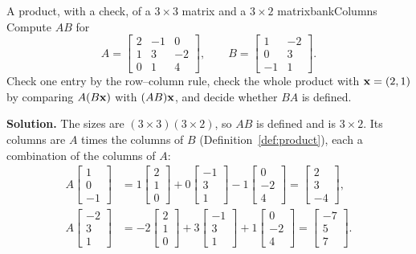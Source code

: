 \documentclass[11pt]{article}
\begin{document}
\begin{exmp}{A product, with a check, of a $3\times3$ matrix and a $3\times2$ matrix}{bankColumns}
Compute $AB$ for
\[
A=\begin{bmatrix}2&-1&0\\1&3&-2\\0&1&4\end{bmatrix},\qquad B=\begin{bmatrix}1&-2\\0&3\\-1&1\end{bmatrix}.
\]
Check one entry by the row--column rule, check the whole product with $\mathbf{x}=(2,1)$ by comparing $A(B\mathbf{x})$ with $(AB)\mathbf{x}$, and decide whether $BA$ is defined.

\textbf{Solution.} The sizes are $(3\times3)(3\times2)$, so $AB$ is defined and is $3\times2$. Its columns are $A$ times the columns of $B$ (Definition~\ref{def:product}), each a combination of the columns of $A$:
\begin{align*}
A\begin{bmatrix}1\\0\\-1\end{bmatrix}&=1\begin{bmatrix}2\\1\\0\end{bmatrix}+0\begin{bmatrix}-1\\3\\1\end{bmatrix}-1\begin{bmatrix}0\\-2\\4\end{bmatrix}=\begin{bmatrix}2\\3\\-4\end{bmatrix},\\
A\begin{bmatrix}-2\\3\\1\end{bmatrix}&=-2\begin{bmatrix}2\\1\\0\end{bmatrix}+3\begin{bmatrix}-1\\3\\1\end{bmatrix}+1\begin{bmatrix}0\\-2\\4\end{bmatrix}=\begin{bmatrix}-7\\5\\7\end{bmatrix}.

\end{align*}
\end{exmp}
\end{document}
